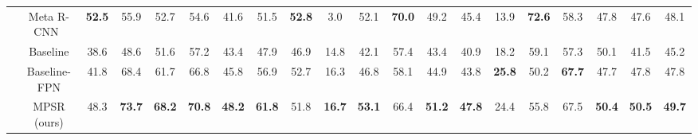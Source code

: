 \documentclass[runningheads]{llncs}
\begin{document}
\begin{sidewaystable}
\begin{center}
\begin{tabular}{c|c|cccccc|cccccc|cccccc}
			& Meta R-CNN~\cite{metarcnn} & \textbf{52.5} & 55.9 & 52.7 & 54.6 & 41.6 & 51.5 & \textbf{52.8} & 3.0 & 52.1 & \textbf{70.0} & 49.2 & 45.4 & 13.9 & \textbf{72.6} & 58.3 & 47.8 & 47.6 & 48.1 \\
			& Baseline & 38.6 & 48.6 & 51.6 & 57.2 & 43.4 & 47.9 & 46.9 & 14.8 & 42.1 & 57.4 & 43.4 & 40.9 & 18.2 & 59.1 & 57.3 & 50.1 & 41.5 & 45.2 \\
			& Baseline-FPN & 41.8 & 68.4 & 61.7 & 66.8 & 45.8 & 56.9 & 52.7 & 16.3 & 46.8 & 58.1 & 44.9 & 43.8 & \textbf{25.8} & 50.2 & \textbf{67.7} & 47.7 & 47.8 & 47.8 \\
			& MPSR (ours) & 48.3 & \textbf{73.7} & \textbf{68.2} & \textbf{70.8} & \textbf{48.2} & \textbf{61.8} & 51.8 & \textbf{16.7} & \textbf{53.1} & 66.4 & \textbf{51.2} & \textbf{47.8} & 24.4 & 55.8 & 67.5 & \textbf{50.4} & \textbf{50.5} & \textbf{49.7} \\ \hline
		\end{tabular}
	\end{center}
\end{sidewaystable}
\setlength{\tabcolsep}{1.4pt}
\end{document}
